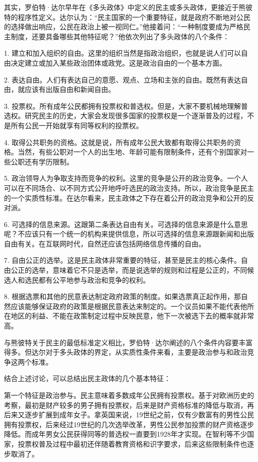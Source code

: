 其实，罗伯特·达尔早年在《多头政体》中定义的民主或多头政体，更接近于熊彼特的程序性定义。达尔认为：“民主国家的一个重要特征，就是政府不断地对公民的选择做出响应，公民在政治上被一视同仁。”他接着问：“一种制度要成为严格民主制度，还要具备哪些其他特征呢？”他依次列出了多头政体的八个条件：

1. 建立和加入组织的自由。这里的组织当然是指政治组织，也就是说人们可以自由决定建立或加入某些政治团体或政党。这是政治自由的一个基本方面。

2. 表达自由。人们有表达自己的意愿、观点、立场和主张的自由。既然有表达自由，就应该有出版自由和新闻自由。

3. 投票权。所有成年公民都拥有投票权和普选权。但是，大家不要机械地理解普选权。研究民主的历史，大家会发现很多国家的投票权是一个逐渐普及的过程，不是所有公民一开始就享有同等权利的投票权。

4. 取得公共职务的资格。这就是说，所有成年公民大致都有取得公共职务的资格。当然，有些公职对一个人的出生地、年龄可能有限制条件，还有个别国家对一些公职还有学历限制。

5. 政治领导人为争取支持而竞争的权利。这里的竞争是公开的政治竞争。一个人可以在不同场合、以不同方式公开地呼吁选民的政治支持。所以，政治竞争是民主的一个实质性标准。在达尔看来，民主政体之下存在着公开的政治竞争和公开的反对派。

6. 可选择的信息来源。这跟第二条表达自由有关。可选择的信息来源是什么意思呢？不应该只有一个统一的机构来提供信息，所以可选择的信息来源跟新闻和出版自由有关。在互联网时代，自然还应该包括网络信息传播的自由。

7. 自由公正的选举。这是民主政体非常重要的特征，甚至是民主的核心条件。自由公正的选举，意味着它不只是选举，而是说选举的规则和过程是公正的，不同候选人和选民都有公平地参与政治和竞争的权利。

8. 根据选票和其他的民意表达制定政府政策的制度。如果选票真正起作用，那自然应该能够保证政府的政策是根据民意表达来制定的。一个议员如果不能代表他所在地区的利益、不能在政策制定过程中反映民意，他下一次被选下去的概率就非常高。

与熊彼特关于民主的最低标准定义相比，罗伯特·达尔阐述的八个条件内容要丰富得多。但达尔对于多头政体的界定，从实质性条件来看，主要是政治参与和政治竞争这两个标准。

结合上述讨论，可以总结出民主政体的几个基本特征：

第一个特征是政治参与。民主意味着多数成年公民拥有投票权。基于对欧洲历史的考察，最初是财产较多的男子拥有投票权，后来是财产资格标准的降低与取消，再后来又逐步扩展到成年女子。拿英国来说，19世纪之前，仅有少数富有的男性公民拥有投票权，后来经过19世纪的几次选举改革，男性公民参加投票的财产资格逐步降低。而成年男女公民获得同等的普选权一直要到1928年才实现。在智利等不少国家，投票权普及过程中最初还伴随着教育资格和识字要求，后来这些限制条件也逐步取消了。

